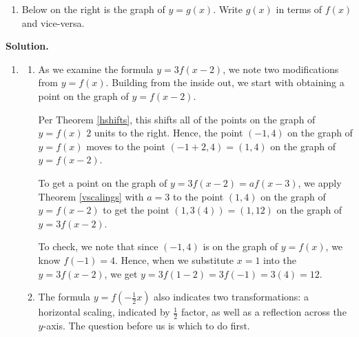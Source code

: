 \documentclass{ximera}
\begin{document}
\begin{example}
\begin{enumerate}
 
 \item \label{gfromfrefex} Below on the right is the graph of $y = g(x)$.  Write $g(x)$ in terms of $f(x)$ and vice-versa.
 

\begin{center}
\end{center}


 
 \end{enumerate}
 

 
 {\bf Solution.}
 
 \begin{enumerate}
 
 \item  
 
 \begin{enumerate}
 
 \item  As we examine the formula  $y = 3f(x-2)$, we note two modifications from $y=f(x)$.  Building from the inside out, we start with obtaining a point on the graph of $y=f(x-2)$. 
 
 \smallskip
 
 Per Theorem \ref{hshifts}, this shifts all of the points on the graph of $y=f(x)$ $2$ units to the right.  Hence, the point $(-1,4)$ on the graph of $y=f(x)$ moves to the point $(-1+2, 4) = (1,4)$  on the graph of $y=f(x-2)$.  
 
 \smallskip
 
 To get a point on the graph of $y = 3f(x-2) = a f(x-3)$, we apply Theorem \ref{vscalings} with $a=3$ to the point $(1,4)$ on the graph of $y=f(x-2)$ to  get the point $(1,3(4)) = (1,12)$ on the graph of $y=3f(x-2)$.  
 
 \smallskip
 
 To check, we note that since $(-1,4)$ is on the graph of $y=f(x)$, we know $f(-1)=4$.  Hence, when we substitute $x=1$ into the $y=3f(x-2)$, we get $y=3f(1-2) = 3f(-1) = 3(4) = 12$.
 
 \item The formula $y = f\left(-\frac{1}{2} x \right)$ also indicates two transformations:  a horizontal scaling, indicated by $\frac{1}{2}$ factor, as well as a reflection across the $y$-axis.  The question before us is which to do first. 
 

\end{enumerate}
\end{enumerate}
\end{example}
\end{document}
